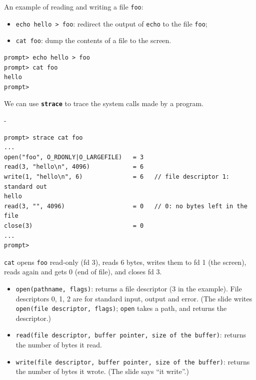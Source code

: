 \documentclass[11pt,a4paper]{article}
\makeatletter
\newcommand{\keepspace}[1]{\par\penalty-100\begingroup
  \setlength{\dimen@}{#1}\dimen@ii\pagegoal\advance\dimen@ii-\pagetotal
  \ifdim\dimen@>\dimen@ii\ifdim\dimen@ii>\z@\vfil\fi\break\fi\endgroup}
\makeatother
\begin{document}
An example of reading and writing a file \texttt{foo}:
\begin{itemize}
  \item \texttt{echo hello > foo}: redirect the output of \texttt{echo} to
        the file \texttt{foo};
  \item \texttt{cat foo}: dump the contents of a file to the screen.
\end{itemize}

\begin{lstlisting}[style=term]
prompt> echo hello > foo
prompt> cat foo
hello
prompt>
\end{lstlisting}

\begin{quizbox}
We can use \textbf{\texttt{strace}} to trace the system calls made by a
program.
\end{quizbox}

\keepspace{7\baselineskip}
\begin{lstlisting}[style=term]
prompt> strace cat foo
...
open("foo", O_RDONLY|O_LARGEFILE)   = 3
read(3, "hello\n", 4096)            = 6
write(1, "hello\n", 6)              = 6   // file descriptor 1: standard out
hello
read(3, "", 4096)                   = 0   // 0: no bytes left in the file
close(3)                            = 0
...
prompt>
\end{lstlisting}

\texttt{cat} opens \texttt{foo} read-only (fd 3), reads 6 bytes, writes them
to fd 1 (the screen), reads again and gets 0 (end of file), and closes fd 3.

\begin{keybox}
\begin{itemize}
  \item \texttt{open(pathname, flags)}: returns a file descriptor (3 in the
        example). File descriptors 0, 1, 2 are for standard input, output and
        error. {\small (The slide writes \texttt{open(file descriptor,
        flags)}; \texttt{open} takes a path, and returns the descriptor.)}
  \item \texttt{read(file descriptor, buffer pointer, size of the buffer)}:
        returns the number of bytes it read.
  \item \texttt{write(file descriptor, buffer pointer, size of the buffer)}:
        returns the number of bytes it wrote. {\small (The slide says ``it write''.)}
\end{itemize}
\end{keybox}
\end{document}
